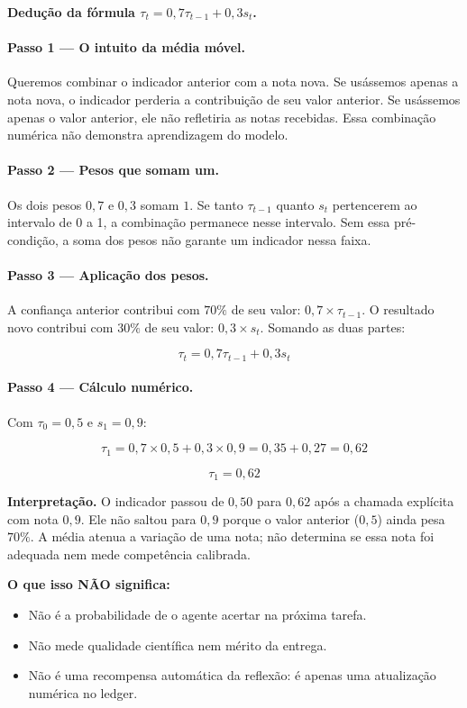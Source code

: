 \begin{metodo}
\textbf{Dedução da fórmula $\tau_t = 0{,}7\tau_{t-1} + 0{,}3s_t$.}

\paragraph{Passo 1 — O intuito da média móvel.}
Queremos combinar o indicador anterior com a nota nova. Se usássemos apenas
a nota nova, o indicador perderia a contribuição de seu valor anterior. Se
usássemos apenas o valor anterior, ele não refletiria as notas recebidas.
Essa combinação numérica não demonstra aprendizagem do modelo.

\paragraph{Passo 2 — Pesos que somam um.}
Os dois pesos $0{,}7$ e $0{,}3$ somam $1$. Se tanto $\tau_{t-1}$ quanto $s_t$
pertencerem ao intervalo de 0 a 1, a combinação permanece nesse intervalo.
Sem essa pré-condição, a soma dos pesos não garante um indicador nessa faixa.

\paragraph{Passo 3 — Aplicação dos pesos.}
A confiança anterior contribui com $70\%$ de seu valor: $0{,}7 \times \tau_{t-1}$. O resultado novo contribui com $30\%$ de seu valor: $0{,}3 \times s_t$. Somando as duas partes:

\[
\boxed{\tau_t = 0{,}7\tau_{t-1} + 0{,}3s_t}
\]

\paragraph{Passo 4 — Cálculo numérico.}
Com $\tau_0 = 0{,}5$ e $s_1 = 0{,}9$:

\[
\tau_1 = 0{,}7 \times 0{,}5 + 0{,}3 \times 0{,}9 = 0{,}35 + 0{,}27 = 0{,}62
\]

\[
\boxed{\tau_1 = 0{,}62}
\]

\end{metodo}

\begin{descricao}
\textbf{Interpretação.} O indicador passou de $0{,}50$ para $0{,}62$ após a
chamada explícita com nota $0{,}9$. Ele não saltou para $0{,}9$ porque o valor
anterior ($0{,}5$) ainda pesa $70\%$. A média atenua a variação de uma nota;
não determina se essa nota foi adequada nem mede competência calibrada.

\textbf{O que isso NÃO significa:}
\begin{itemize}[leftmargin=1.3em,itemsep=1pt]
  \item Não é a probabilidade de o agente acertar na próxima tarefa.
  \item Não mede qualidade científica nem mérito da entrega.
  \item Não é uma recompensa automática da reflexão: é apenas uma atualização numérica no ledger.
\end{itemize}
\end{descricao}


